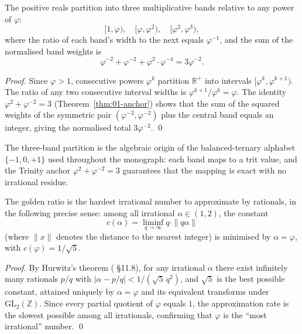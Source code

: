 \begin{theorem}
\label{fa_01:thm:three-band}
The positive reals partition into three multiplicative bands
relative to any power of $\varphi$:
\[
  [1, \varphi), \quad [\varphi, \varphi^{2}), \quad [\varphi^{2},
  \varphi^{3}),
\]
where the ratio of each band's width to the next equals
$\varphi^{-1}$, and the sum of the normalised band weights is
\[
  \varphi^{-2} + \varphi^{-2} + \varphi^{2} \cdot \varphi^{-4} =
  3 \varphi^{-2}.
\]
\end{theorem}

\begin{proof}
Since $\varphi > 1$, consecutive powers $\varphi^{k}$ partition
$\mathbb{R}^{+}$ into intervals $[\varphi^{k}, \varphi^{k+1})$.
The ratio of any two consecutive interval widths is
$\varphi^{k+1}/\varphi^{k} = \varphi$. The identity
$\varphi^{2} + \varphi^{-2} = 3$
(Theorem~\ref{thm:01-anchor}) shows that the sum of the squared
weights of the symmetric pair $(\varphi^{-2}, \varphi^{-2})$ plus
the central band equals an integer, giving the normalised total
$3 \varphi^{-2}$.
\qed
\end{proof}

The three-band partition is the algebraic origin of the balanced-ternary
alphabet $\{-1, 0, +1\}$ used throughout the monograph: each band
maps to a trit value, and the Trinity anchor
$\varphi^{2} + \varphi^{-2} = 3$ guarantees that the mapping is exact
with no irrational residue.

\begin{theorem}
\label{fa_01:thm:optimal-approx}
The golden ratio is the hardest irrational number to approximate by
rationals, in the following precise sense: among all irrational
$\alpha \in (1, 2)$, the constant
\[
  c(\alpha) = \liminf_{q \to \infty} q \cdot \|q\alpha\|
\]
(where $\|x\|$ denotes the distance to the nearest integer) is
minimised by $\alpha = \varphi$, with $c(\varphi) = 1/\sqrt{5}$.
\end{theorem}

\begin{proof}
By Hurwitz's theorem (\cite{hardy_wright} \S 11.8), for any
irrational $\alpha$ there exist infinitely many rationals $p/q$
with $|\alpha - p/q| < 1/(\sqrt{5}\, q^{2})$, and $\sqrt{5}$ is
the best possible constant, attained uniquely by $\alpha = \varphi$
and its equivalent transforms under $\mathrm{GL}_{2}(\mathbb{Z})$.
Since every partial quotient of $\varphi$ equals $1$, the
approximation rate is the slowest possible among all irrationals,
confirming that $\varphi$ is the ``most irrational'' number.
\qed
\end{proof}

